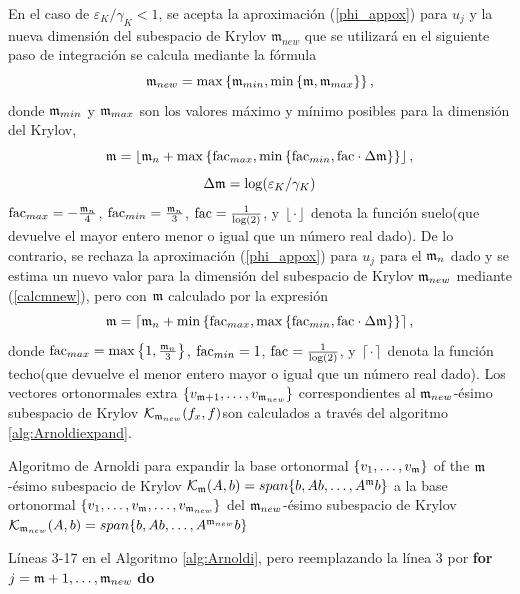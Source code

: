 En el caso de $\varepsilon_{K}/\gamma_{K}< 1$, se acepta la aproximación (\ref{phi_appox}) para $u_j$ y la nueva dimensión del subespacio de Krylov $\mathfrak{m}_{new}$ que se utilizará en el siguiente paso de integración se calcula mediante la fórmula
\begin{equation}\label{calcmnew}
    \mathfrak{m}_{new}= \max\left\{ \mathfrak{m}_{min}, \min\left\{ \mathfrak{m} , \mathfrak{m}_{max}  \right\} \right\},
\end{equation}
    donde $\mathfrak{m}_{min}$ y $\mathfrak{m}_{max}$ son los valores máximo y mínimo posibles para la dimensión del Krylov,
\begin{equation*}
    \mathfrak{m} = \left\lfloor \mathfrak{m}_{n} + \max\left\{ \mathrm{fac}_{max} , \min\left\{ \mathrm{fac}_{min},
            \mathrm{fac}\cdot\Delta\mathfrak{m} \right\}  \right\} \right\rfloor,
\end{equation*}
\begin{equation}
    \Delta\mathfrak{m}=\log(\varepsilon_{K}/\gamma_{K}) \label{delta_m}
\end{equation}
$\mathrm{fac}_{max}= -\frac{\mathfrak{m}_n}{4}$, $\mathrm{fac}_{min}= \frac{\mathfrak{m}_n}{3}$, $\mathrm{fac}=\frac{1}{\log( 2)}$, y $\left\lfloor \cdot \right\rfloor$ denota la función suelo(que devuelve el mayor entero menor o igual que un número real dado). De lo contrario, se rechaza la aproximación (\ref{phi_appox}) para $u_j$ para el $\mathfrak{m}_n$ dado y se estima un nuevo valor para la dimensión del subespacio de Krylov $\mathfrak{m}_{new}$ mediante (\ref{calcmnew}), pero con $\mathfrak{m}$ calculado por la expresión
\begin{equation*}
    \mathfrak{m} = \left\lceil \mathfrak{m}_{n} + \min\left\{ \mathrm{fac}_{max} , \max\left\{ \mathrm{fac}_{min},
            \mathrm{fac}\cdot\Delta\mathfrak{m} \right\}  \right\} \right\rceil,
\end{equation*}
donde $\mathrm{fac}_{max}= \max\left\{  1,\frac{\mathfrak{m}_{n}}{3}  \right\}$, $\mathrm{fac}_{min}= 1 $, $\mathrm{fac}=\frac{1}{\log (2)}$, y $\left\lceil \cdot \right\rceil$ denota la función techo(que devuelve el menor entero mayor o igual que un número real dado). Los vectores ortonormales extra $\{v_{\mathfrak{m}+1},\ldots,v_{\mathfrak{m}_{new}} \}$ correspondientes al $\mathfrak{m}_{new}$-ésimo subespacio de Krylov $\mathcal{K}_{\mathfrak{m}_{new}}(f_x,f)$son calculados a través del algoritmo \ref{alg:Arnoldiexpand}.
\begin{algorithm}[h!]
	\caption{Algoritmo de Arnoldi para expandir la base ortonormal $\{v_1,\ldots,v_{\mathfrak{m}} \}$ of the $\mathfrak{m}$-ésimo subespacio de Krylov $\mathcal{K}_{\mathfrak{m}}(A,b)=span\{b,Ab,\ldots,A^{\mathfrak{m}}b\}$ a la base ortonormal $\{v_1,\ldots,v_{\mathfrak{m}},\ldots,v_{\mathfrak{m}_{new}} \}$ del $\mathfrak{m}_{new}$-ésimo subespacio de Krylov ${\mathcal{K}_{\mathfrak{m}_{new}}(A,b)=span\{b,Ab,\ldots,A^{\mathfrak{m}_{new}}b\}}$}
    \label{alg:Arnoldiexpand}
	Líneas 3-17 en el Algoritmo \ref{alg:Arnoldi}, pero reemplazando la línea 3 por \textbf{for} $j=\mathfrak{m}+1,\ldots,\mathfrak{m}_{new}$ \textbf{do}
\end{algorithm}
